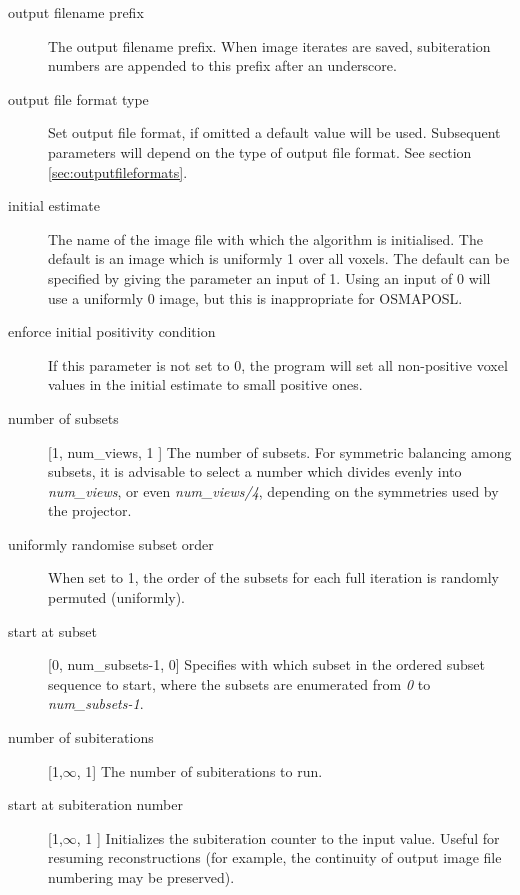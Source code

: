 \documentclass{article}
\begin{document}
{ 
}
\label{sec:IterativeReconSettings}
\begin{description}

\item[output filename prefix]
 The output filename prefix. When image iterates are saved, subiteration 
numbers are appended to this prefix after an underscore.

\item[output file format type]
Set output file format, if omitted a default value will be used. 
Subsequent parameters will depend on the type of output file 
format. See section \ref{sec:outputfileformats}.


\item[initial estimate]
The name of the image file with which the algorithm is initialised. 
The default is an image which is uniformly 1 over all voxels. 
The default can be specified by giving the parameter an input 
of 1. Using an input of 0 will use a uniformly 0 image, but this 
is inappropriate for OSMAPOSL.


\item[enforce initial positivity condition]
If this parameter is not set to 0, the program will set all non-positive 
voxel values in the initial estimate to small positive ones.


\item[number of subsets] [1, num\_views, 1 {]}
The number of subsets. For symmetric balancing among subsets, 
it is advisable to select a number which divides evenly into \textit{num\_views},
or even \textit{num\_views/4}, depending on the symmetries used by the projector.


\item[uniformly randomise subset order]
When set to 1, the order of the subsets for each full iteration 
is randomly permuted (uniformly).


\item[start at subset] [0, num\_subsets-1, 0{]}
Specifies with which subset in the ordered subset sequence to 
start, where the subsets are enumerated from \textit{0} to \textit{num\_subsets-1}. 

\item[number of subiterations] [1,\ensuremath{\infty}, 1{]}
The number of subiterations to run.


\item[start at subiteration number] [1,\ensuremath{\infty}, 1 {]}
Initializes the subiteration counter to the input value. Useful 
for resuming reconstructions (for example, the continuity of 
output image file numbering may be preserved).



\end{description}
\end{document}
